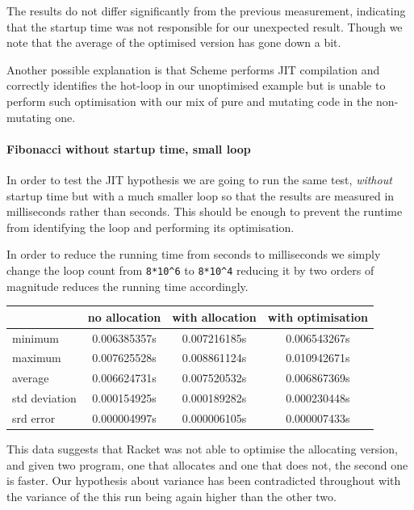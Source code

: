 \documentclass[
]{article}
\begin{document}
The results do not differ significantly from the previous measurement,
indicating that the startup time was not responsible for our unexpected
result. Though we note that the average of the optimised version has
gone down a bit.

Another possible explanation is that Scheme performs JIT compilation and
correctly identifies the hot-loop in our unoptimised example but is
unable to perform such optimisation with our mix of pure and mutating
code in the non-mutating one.

\hypertarget{fibonacci-without-startup-time-small-loop}{%
\paragraph{Fibonacci without startup time, small
loop}\label{fibonacci-without-startup-time-small-loop}}

In order to test the JIT hypothesis we are going to run the same test,
\emph{without} startup time but with a much smaller loop so that the
results are measured in milliseconds rather than seconds. This should be
enough to prevent the runtime from identifying the loop and performing
its optimisation.

In order to reduce the running time from seconds to milliseconds we
simply change the loop count from \texttt{8*10\^{}6} to
\texttt{8*10\^{}4} reducing it by two orders of magnitude reduces the
running time accordingly.

\begin{tabular}{ l | c c c }
          & no allocation & with allocation & with optimisation\\
\hline 
  minimum       & 0.006385357s & 0.007216185s & 0.006543267s \\
  maximum       & 0.007625528s & 0.008861124s & 0.010942671s \\ 
  average       & 0.006624731s & 0.007520532s & 0.006867369s \\
  std deviation & 0.000154925s & 0.000189282s & 0.000230448s \\
  srd error     & 0.000004997s & 0.000006105s & 0.000007433s \\\end{tabular}

This data suggests that Racket was not able to optimise the allocating
version, and given two program, one that allocates and one that does
not, the second one is faster. Our hypothesis about variance has been
contradicted throughout with the variance of the this run being again
higher than the other two.
\end{document}
